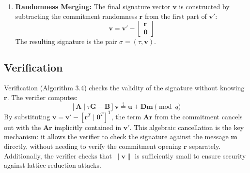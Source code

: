 \documentclass[a4paper]{article}
\newcommand{\sig}{\sigma}
\begin{document}
\begin{enumerate}
    \item \textbf{Randomness Merging:} The final signature vector $\mathbf{v}$ is constructed by subtracting the commitment
          randomness $\mathbf{r}$ from the first part of $\mathbf{v}'$:
          \begin{equation}
              \mathbf{v} = \mathbf{v}' - \begin{bmatrix} \mathbf{r} \\ \mathbf{0} \end{bmatrix}
          \end{equation}
          The resulting signature is the pair $\sig = (\tau, \mathbf{v})$.
\end{enumerate}

\subsection{Verification}
Verification (Algorithm 3.4) checks the validity of the signature without knowing $\mathbf{r}$. The verifier computes:
\begin{equation}\label{eq:correctness}
    [\mathbf{A} \mid \tau\mathbf{G} - \mathbf{B}] \mathbf{v} \stackrel{?}{=} \mathbf{u} + \mathbf{D}\mathbf{m} \pmod q
\end{equation}
By substituting $\mathbf{v} = \mathbf{v}' - [\mathbf{r}^T \mid \mathbf{0}^T]^T$, the term $\mathbf{A}\mathbf{r}$ from the
commitment cancels out with the $\mathbf{A}\mathbf{r}$ implicitly contained in $\mathbf{v}'$. This algebraic cancellation
is the key mechanism: it allows the verifier to check the signature against the message $\mathbf{m}$ directly, without
needing to verify the commitment opening $\mathbf{r}$ separately. Additionally, the verifier checks that
$\|\mathbf{v}\|$ is sufficiently small to ensure security against lattice reduction attacks.
\end{document}
